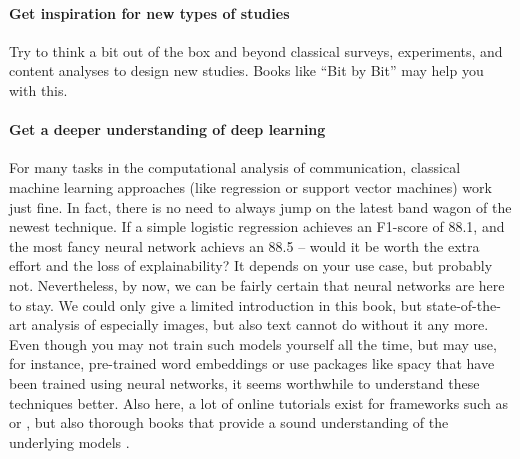 \paragraph{Get inspiration for new types of studies} Try to think a bit out of the box and beyond classical surveys, experiments, and content analyses to design new studies. Books like ``Bit by Bit'' \cite{Salganik2019} may help you with this.


\paragraph{Get a deeper understanding of deep learning} For many tasks in the computational analysis of communication, classical machine learning approaches (like regression or support vector machines) work just fine. In fact, there is no need to always jump on the latest band wagon of the newest technique. If a simple logistic regression achieves an F1-score of 88.1, and the most fancy neural network achievs an 88.5 -- would it be worth the extra effort and the loss of explainability? It depends on your use case, but probably not. Nevertheless, by now, we can be fairly certain that neural networks are here to stay. We could only give a limited introduction in this book, but state-of-the-art analysis of especially images, but also text cannot do without it any more. Even though you may not train such models yourself all the time, but may use, for instance, pre-trained word embeddings or use packages like spacy that have been trained using neural networks, it seems worthwhile to understand these techniques better. Also here, a lot of online tutorials exist for frameworks such as  or , but also thorough books that provide a sound understanding of the underlying models \cite{goldberg2017}.


